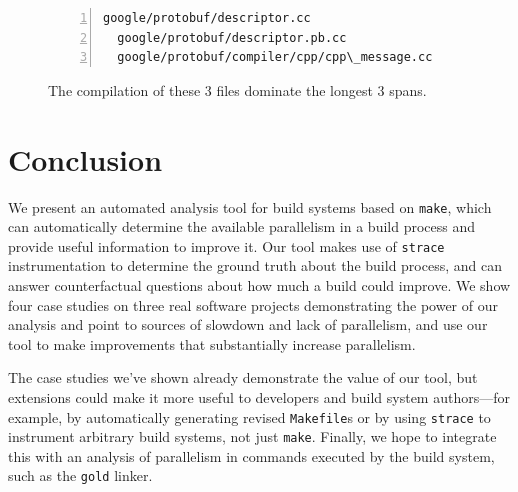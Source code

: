 \documentclass[sigconf,10pt,review,authorversion]{acmart}\settopmatter{printfolios=true,printccs=false,printacmref=false}
\begin{document}
\begin{figure}[H]
\begin{Verbatim}[commandchars=\\\{\},codes={\catcode`$=3\catcode`^=7\catcode`_=8},fontsize=\small,numbers=left,xleftmargin=5mm]
  google/protobuf/descriptor.cc
  google/protobuf/descriptor.pb.cc
  google/protobuf/compiler/cpp/cpp\_message.cc
\end{Verbatim}
\caption{The compilation of these 3 files dominate the longest 3 spans.}
\label{code:g++1}
\end{figure}



\section{Conclusion}

We present an automated analysis tool for build systems based on
\verb|make|, which can automatically determine the available
parallelism in a build process and provide useful information to
improve it. Our tool makes use of \verb|strace| instrumentation to
determine the ground truth about the build process, and can answer
counterfactual questions about how much a build could improve.
%
We show four case studies on three real software projects
demonstrating the power of our analysis and point to sources of
slowdown and lack of parallelism, and use our tool to make
improvements that substantially increase parallelism.

The case studies we've shown already demonstrate the value of our
tool, but extensions could make it more useful to developers and build
system authors---for example, by automatically generating revised
\verb|Makefile|s or by using \verb|strace| to instrument arbitrary
build systems, not just \verb|make|. Finally, we hope to integrate
this with an analysis of parallelism in commands executed by the build
system, such as the \verb|gold| linker.

 

\balance
\end{document}
